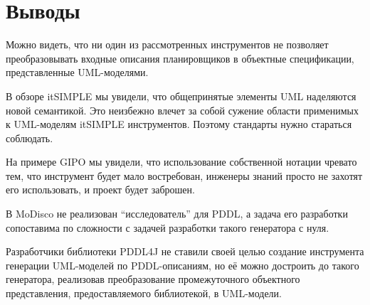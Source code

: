 \section{Выводы}


Можно видеть, что ни один из рассмотренных инструментов не позволяет преобразовывать входные описания планировщиков в объектные спецификации, представленные UML-моделями. 

В обзоре itSIMPLE мы увидели, что общепринятые элементы UML наделяются новой семантикой. Это неизбежно влечет за собой сужение области применимых к UML-моделям itSIMPLE инструментов. Поэтому стандарты нужно стараться соблюдать.

На примере GIPO мы увидели, что использование собственной нотации чревато тем, что инструмент будет мало востребован, инженеры знаний просто не захотят его использовать, и проект будет заброшен. 

В MoDisco не реализован ``исследователь'' для PDDL, а задача его разработки сопоставима по сложности с задачей разработки такого генератора с нуля.

Разработчики библиотеки PDDL4J не ставили своей целью создание инструмента генерации UML-моделей по PDDL-описаниям, но её можно достроить до такого генератора, реализовав преобразование  промежуточного объектного представления, предоставляемого библиотекой, в UML-модели.

\newpage